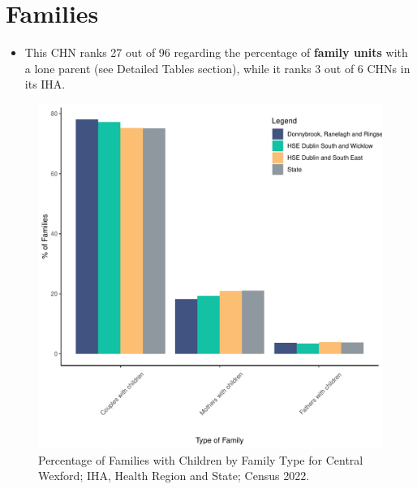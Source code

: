 \documentclass{article}
\begin{document}
\section{Families}\label{sect:Fam}
\begin{itemize}
\item This CHN ranks  27 out of 96 regarding the percentage of \textbf{family units} with a lone parent (see Detailed Tables section), while it ranks   3 out of 6 CHNs in its IHA.
\end{itemize}
\begin{figure}[H]
	\centering
	\includegraphics[width = 150mm]{../figures/FamED.pdf}
	\caption{Percentage of Families with Children by Family Type for Central Wexford; IHA, Health Region and State; Census 2022.}
	\label{fig:vbnv}
	\end{figure}
	
\end{document}

